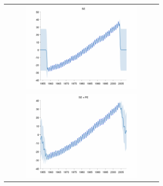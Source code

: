 \documentclass[twoside]{article}
\begin{document}
\begin{figure}[h!]
\centering
\newcommand{\wmg}{8cm}  %
\newcommand{\hmg}{4.5cm}  %
\begin{tabular}{c}
 \includegraphics[width=\wmg,height=\hmg]{../figures/decomposition/03-mauna2003_max_level_0/03-mauna2003_all} \\ 
 \includegraphics[width=\wmg,height=\hmg]{../figures/decomposition/03-mauna2003_max_level_1/03-mauna2003_all} \\

\end{tabular}
\end{figure}
\end{document}
